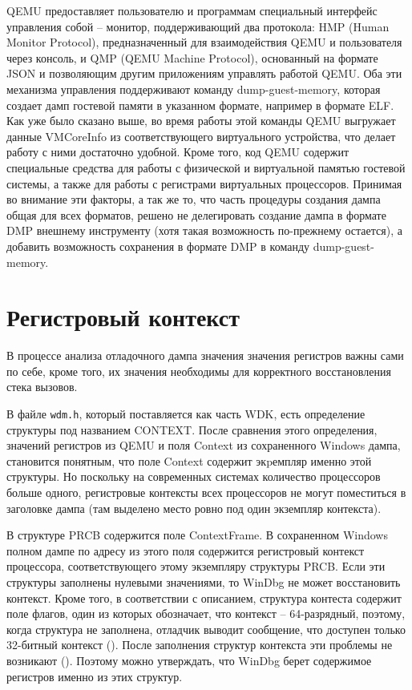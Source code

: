 \documentclass{mipt-thesis-bs}
\begin{document}
QEMU предоставляет пользователю и программам специальный интерфейс управления собой -- монитор, поддерживающий два протокола: HMP (Human Monitor Protocol), предназначенный для взаимодействия QEMU и пользователя через консоль, и QMP (QEMU Machine Protocol), основанный на формате JSON и позволяющим другим приложениям управлять работой QEMU. Оба эти механизма управления поддерживают команду dump-guest-memory, которая создает дамп гостевой памяти в указанном формате, например в формате ELF. Как уже было сказано выше, во время работы этой команды QEMU выгружает данные VMCoreInfo из соответствующего виртуального устройства, что делает работу с ними достаточно удобной. Кроме того, код QEMU содержит специальные средства для работы с физической и виртуальной памятью гостевой системы, а также для работы с регистрами виртуальных процессоров. Принимая во внимание эти факторы, а так же то, что часть процедуры создания дампа общая для всех форматов, решено не делегировать создание дампа в формате DMP внешнему инструменту (хотя такая возможность по-прежнему остается), а добавить возможность сохранения в формате DMP в команду dump-guest-memory.

\section*{Регистровый контекст}

В процессе анализа отладочного дампа значения значения регистров важны сами по себе, кроме того, их значения необходимы для корректного восстановления стека вызовов.

В файле \texttt{wdm.h}, который поставляется как часть WDK, есть определение структуры под названием CONTEXT. После сравнения этого определения, значений регистров из QEMU и поля Context из сохраненного Windows дампа, становится понятным, что поле Context содержит экpемпляр именно этой структуры. Но поскольку на современных системах количество процессоров больше одного, регистровые контексты всех процессоров не могут поместиться в заголовке дампа (там выделено место ровно под один экземпляр контекста).

В структуре PRCB содержится поле ContextFrame. В сохраненном Windows полном дампе по адресу из этого поля содержится регистровый контекст процессора, соответствующего этому экземпляру структуры PRCB. Если эти структуры заполнены нулевыми значениями, то WinDbg не может восстановить контекст. Кроме того, в соответствии с описанием, структура контеста содержит поле флагов, один из которых обозначает, что контекст -- 64-разрядный, поэтому, когда структура не заполнена, отладчик выводит сообщение, что доступен только 32-битный контекст (). После заполнения структур контекста эти проблемы не возникают (). Поэтому можно утверждать, что WinDbg берет содержимое регистров именно из этих структур.
\end{document}
